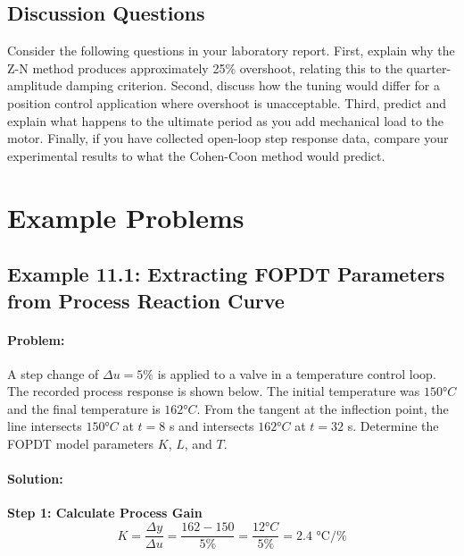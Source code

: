 \subsection{Discussion Questions}

Consider the following questions in your laboratory report. First, explain why the Z-N method produces approximately 25\% overshoot, relating this to the quarter-amplitude damping criterion. Second, discuss how the tuning would differ for a position control application where overshoot is unacceptable. Third, predict and explain what happens to the ultimate period as you add mechanical load to the motor. Finally, if you have collected open-loop step response data, compare your experimental results to what the Cohen-Coon method would predict.


\section{Example Problems}
\label{sec:pid_tuning_examples}

\subsection{Example 11.1: Extracting FOPDT Parameters from Process Reaction Curve}

\paragraph{Problem:} A step change of $\Delta u = 5\%$ is applied to a valve in a temperature control loop. The recorded process response is shown below. The initial temperature was $150°C$ and the final temperature is $162°C$. From the tangent at the inflection point, the line intersects $150°C$ at $t = 8$ s and intersects $162°C$ at $t = 32$ s. Determine the FOPDT model parameters $K$, $L$, and $T$.

\paragraph{Solution:}

\textbf{Step 1: Calculate Process Gain}
\begin{equation}
    K = \frac{\Delta y}{\Delta u} = \frac{162 - 150}{5\%} = \frac{12°C}{5\%} = 2.4 \text{ °C/\%}
\end{equation}

